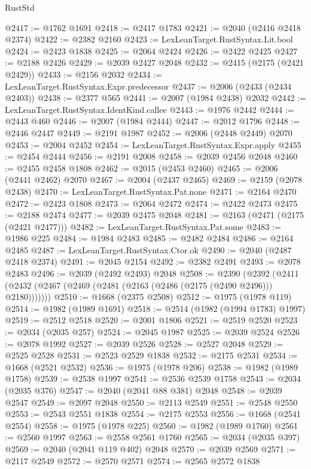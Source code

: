 \begin{lexlean}{RustStd}
\begin{coremodule}
@2417 := @1762 @1691
@2418 := @2417 @1783
@2421 := @2040 (@2416 @2418 @2374)
@2422 := @2382 @2160
@2423 := LexLeanTarget.RustSyntax.Lit.bool
@2424 := @2423 @1838
@2425 := @2064 @2424
@2426 := @2422 @2425
@2427 := @2188 @2426
@2429 := @2039 @2427 @2048
@2432 := @2415 (@2175 (@2421 @2429))
@2433 := @2156 @2032
@2434 := LexLeanTarget.RustSyntax.Expr.predecessor
@2437 := @2006 (@2433 (@2434 @2403))
@2438 := @2377 @565
@2441 := @2007 (@1984 @2438) @2032
@2442 := LexLeanTarget.RustSyntax.IdentKind.callee
@2443 := @1976 @2442
@2444 := @2443 @460
@2446 := @2007 (@1984 @2444)
@2447 := @2012 @1796
@2448 := @2446 @2447
@2449 := @2191 @1987
@2452 := @2006 (@2448 @2449) @2070
@2453 := @2004 @2452
@2454 := LexLeanTarget.RustSyntax.Expr.apply
@2455 := @2454 @2444
@2456 := @2191 @2008
@2458 := @2039 @2456 @2048
@2460 := @2455 @2458 @1808
@2462 := @2015 (@2453 @2460)
@2465 := @2006 (@2441 @2462) @2070
@2467 := @2004 (@2437 @2465)
@2469 := @2159 (@2078 @2438)
@2470 := LexLeanTarget.RustSyntax.Pat.none
@2471 := @2164 @2470
@2472 := @2423 @1808
@2473 := @2064 @2472
@2474 := @2422 @2473
@2475 := @2188 @2474
@2477 := @2039 @2475 @2048
@2481 := @2163 (@2471 (@2175 (@2421 @2477)))
@2482 := LexLeanTarget.RustSyntax.Pat.some
@2483 := @1986 @225
@2484 := @1984 @2483
@2485 := @2482 @2484
@2486 := @2164 @2485
@2487 := LexLeanTarget.RustSyntax.Ctor.ok
@2490 := @2040 (@2487 @2418 @2374)
@2491 := @2045 @2154
@2492 := @2382 @2491
@2493 := @2078 @2483
@2496 := @2039 (@2492 @2493) @2048
@2508 := @2390
    (@2392 (@2411 (@2432 (@2467 (@2469 (@2481 (@2163 (@2486 (@2175 (@2490 @2496))) @2180)))))))
@2510 := @1668 (@2375 @2508)
@2512 := @1975 (@1978 @119)
@2514 := @1982 (@1989 @1691)
@2518 := @2514 (@1982 (@1994 @1783) @1997)
@2519 := @2512 @2518
@2520 := @2001 @1806
@2521 := @2519 @2520
@2523 := @2034 (@2035 @257)
@2524 := @2045 @1987
@2525 := @2039 @2524
@2526 := @2078 @1992
@2527 := @2039 @2526
@2528 := @2527 @2048
@2529 := @2525 @2528
@2531 := @2523 @2529 @1838
@2532 := @2175 @2531
@2534 := @1668 (@2521 @2532)
@2536 := @1975 (@1978 @206)
@2538 := @1982 (@1989 @1758)
@2539 := @2538 @1997
@2541 := @2536 @2539 @1758
@2543 := @2034 (@2035 @376)
@2547 := @2040 (@2041 @88 @381) @2048
@2548 := @2039 @2547
@2549 := @2097 @2048
@2550 := @2113 @2549
@2551 := @2548 @2550
@2553 := @2543 @2551 @1838
@2554 := @2175 @2553
@2556 := @1668 (@2541 @2554)
@2558 := @1975 (@1978 @225)
@2560 := @1982 (@1989 @1760)
@2561 := @2560 @1997
@2563 := @2558 @2561 @1760
@2565 := @2034 (@2035 @397)
@2569 := @2040 (@2041 @119 @402) @2048
@2570 := @2039 @2569
@2571 := @2117 @2549
@2572 := @2570 @2571
@2574 := @2565 @2572 @1838

\end{coremodule}
\end{lexlean}
